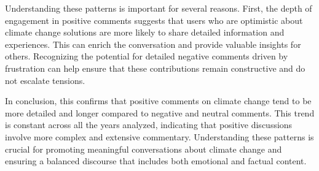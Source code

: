 Understanding these patterns is important for several reasons. First, the depth of engagement in positive comments suggests that users who are optimistic about climate change solutions are more likely to share detailed information and experiences. This can enrich the conversation and provide valuable insights for others. Recognizing the potential for detailed negative comments driven by frustration can help ensure that these contributions remain constructive and do not escalate tensions.

In conclusion, this confirms that positive comments on climate change tend to be more detailed and longer compared to negative and neutral comments. This trend is constant across all the years analyzed, indicating that positive discussions involve more complex and extensive commentary. Understanding these patterns is crucial for promoting meaningful conversations about climate change and ensuring a balanced discourse that includes both emotional and factual content.